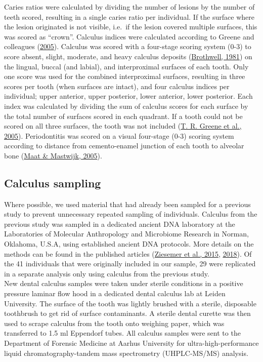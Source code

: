\documentclass[
  letterpaper,
]{book}
\begin{document}
Caries ratios were calculated by dividing the number of lesions by the
number of teeth scored, resulting in a single caries ratio per
individual. If the surface where the lesion originated is not visible,
i.e.~if the lesion covered multiple surfaces, this was scored as
``crown''. Calculus indices were calculated according to Greene and
colleagues
(\protect\hyperlink{ref-greeneQuantifyingCalculus2005}{2005}). Calculus
was scored with a four-stage scoring system (0-3) to score absent,
slight, moderate, and heavy calculus deposits
(\protect\hyperlink{ref-brothwellDiggingBones1981}{Brothwell, 1981}) on
the lingual, buccal (and labial), and interproximal surfaces of each
tooth. Only one score was used for the combined interproximal surfaces,
resulting in three scores per tooth (when surfaces are intact), and four
calculus indices per individual; upper anterior, upper posterior, lower
anterior, lower posterior. Each index was calculated by dividing the sum
of calculus scores for each surface by the total number of surfaces
scored in each quadrant. If a tooth could not be scored on all three
surfaces, the tooth was not included
(\protect\hyperlink{ref-greeneQuantifyingCalculus2005}{T. R. Greene et
al., 2005}). Periodontitis was scored on a visual four-stage (0-3)
scoring system according to distance from cemento-enamel junction of
each tooth to alveolar bone
(\protect\hyperlink{ref-maatManualPhysical2005}{Maat \& Mastwijk,
2005}).

\hypertarget{calculus-sampling}{%
\subsection{Calculus sampling}\label{calculus-sampling}}

Where possible, we used material that had already been sampled for a
previous study to prevent unnecessary repeated sampling of individuals.
Calculus from the previous study was sampled in a dedicated ancient DNA
laboratory at the Laboratories of Molecular Anthropology and Microbiome
Research in Norman, Oklahoma, U.S.A, using established ancient DNA
protocols. More details on the methods can be found in the published
articles (\protect\hyperlink{ref-ziesemer16SChallenges2015}{Ziesemer et
al., 2015}, \protect\hyperlink{ref-ziesemerGenomeCalculus2018}{2018}).
Of the 41 individuals that were originally included in our sample, 29
were replicated in a separate analysis only using calculus from the
previous study.\\
New dental calculus samples were taken under sterile conditions in a
positive pressure laminar flow hood in a dedicated dental calculus lab
at Leiden University. The surface of the tooth was lightly brushed with
a sterile, disposable toothbrush to get rid of surface contaminants. A
sterile dental curette was then used to scrape calculus from the tooth
onto weighing paper, which was transferred to 1.5 ml Eppendorf tubes.
All calculus samples were sent to the Department of Forensic Medicine at
Aarhus University for ultra-high-performance liquid
chromatography-tandem mass spectrometry (UHPLC-MS/MS) analysis.
\end{document}
